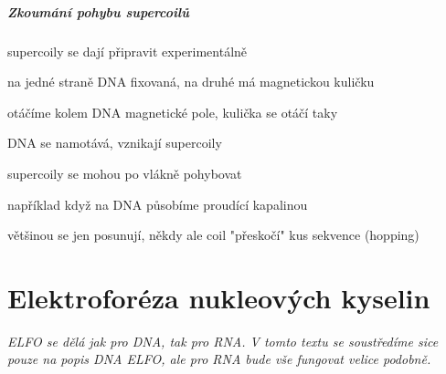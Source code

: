 \documentclass[DIV=8]{scrreprt}
\begin{document}
\paragraph{Zkoumání pohybu supercoilů}
\begin{myItemize}[nosep]
    \item supercoily se dají připravit experimentálně
\begin{myEnumerate}[nosep]
    \item na jedné straně DNA fixovaná, na druhé má magnetickou kuličku
    \item otáčíme kolem DNA magnetické pole, kulička se otáčí taky
    \item DNA se namotává, vznikají supercoily
\end{myEnumerate}

    \item supercoily se mohou po vlákně pohybovat
\begin{myItemize}[nosep]
    \item například když na DNA působíme proudící kapalinou
    \item většinou se jen posunují, někdy ale coil "přeskočí" kus sekvence (hopping)
\end{myItemize}

\end{myItemize}



\chapter{Elektroforéza nukleových kyselin} \label{Elektroforéza nukleových kyselin}


\emph{ELFO se dělá jak pro DNA, tak pro RNA. V tomto textu se soustředíme sice pouze na popis DNA ELFO, ale pro RNA bude vše fungovat velice podobně.}
\end{document}
